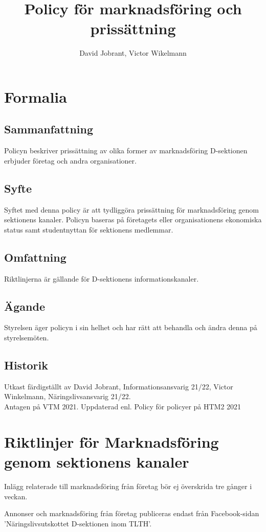 \documentclass{dsekprotokoll}
\title{Policy för marknadsföring och prissättning}
\author{David Jobrant, Victor Wikelmann}
\begin{document}
\maketitle
\section{Formalia}
\subsection{Sammanfattning}
Policyn beskriver prissättning av olika former av marknadsföring D-sektionen erbjuder företag och andra organisationer.

\subsection{Syfte}
Syftet med denna policy är att tydliggöra prissättning för marknadsföring genom sektionens kanaler. Policyn baseras på företagets eller organisationens ekonomiska status samt studentnyttan för sektionens medlemmar.

\subsection{Omfattning}
Riktlinjerna är gällande för D-sektionens informationskanaler.

\subsection{Ägande}
Styrelsen äger policyn i sin helhet och har rätt att behandla och ändra denna på styrelsemöten.

\subsection{Historik}
Utkast färdigställt av David Jobrant, Informationsansvarig 21/22, Victor Winkelmann, Näringslivsansvarig 21/22. \\
Antagen på VTM 2021.
Uppdaterad enl. Policy för policyer på HTM2 2021

\section{Riktlinjer för Marknadsföring genom sektionens kanaler}
Inlägg relaterade till marknadsföring från företag bör ej överskrida tre gånger i veckan.

Annonser och marknadsföring från företag publiceras endast från Facebook-sidan 'Näringslivsutskottet D-sektionen inom TLTH'.
\end{document}
